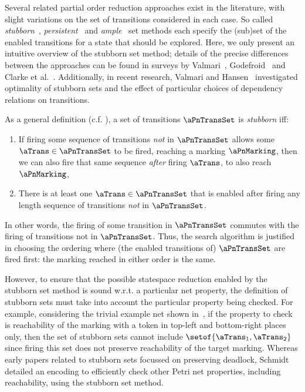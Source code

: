 Several related partial order reduction approaches exist in the literature, with
slight variations on the set of transitions considered in each case. So called
\emph{stubborn}~\cite{Valmari1991}, \emph{persistent}~\cite{Godefroid1990} and
\emph{ample}~\cite{Peled1993} set methods each specify the (sub)set of the
enabled transitions for a state that should be explored. Here, we only present
an intuitive overview of the stubborn set method; details of the precise
differences between the approaches can be found in surveys by
Valmari~\cite{Valmari1998}, Godefroid~\cite{Godefroid1996a} and {Clarke et
al.}~\cite{Clarke1999}. Additionally, in recent research, {Valmari and
Hansen}~\cite{Valmari2011} investigated optimality of stubborn sets and the
effect of particular choices of dependency relations on transitions.

As a general definition (c.f. \cite{Valmari1998}), a set of transitions
$\aPnTransSet$ is \emph{stubborn} iff:
\begin{enumerate}
    \item If firing some sequence of transitions \emph{not} in $\aPnTransSet$
        allows some $\aTrans \in \aPnTransSet$ to be fired, reaching a marking
        $\aPnMarking$, then we can also fire that same sequence \emph{after}
        firing $\aTrans$, to also reach $\aPnMarking$,
    \item There is at least one $\aTrans \in \aPnTransSet$ that is enabled
        after firing any length sequence of transitions \emph{not} in
        $\aPnTransSet$.
\end{enumerate}

In other words, the firing of some transition in $\aPnTransSet$ commutes with
the firing of transitions not in $\aPnTransSet$. Thus, the search
algorithm is justified in choosing the ordering where (the enabled transitions
of) $\aPnTransSet$ are fired first: the marking reached in either order is the
same.

However, to ensure that the possible statespace reduction enabled by the
stubborn set method is sound w.r.t. a particular net property, the definition
of stubborn sets must take into account the particular property being checked.
For example, considering the trivial example net shown
in~, if the property to check is reachability
of the marking with a token in top-left and bottom-right places only, then the
set of stubborn sets cannot include $\setof{\aTrans_1, \aTrans_2}$ since firing
this set does not preserve reachability of the target marking.  Whereas early
papers related to stubborn sets focussed on preserving deadlock,
Schmidt~\cite{Schmidt1999} detailed an encoding to efficiently check other
Petri net properties, including reachability, using the stubborn set method.

